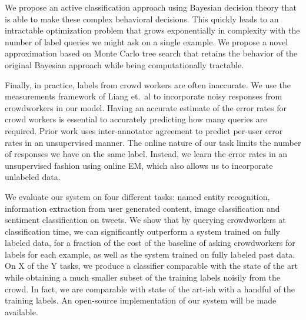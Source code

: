 We propose an active classification approach using Bayesian decision theory that is able to make these complex behavioral decisions.
This quickly leads to an intractable optimization problem that grows exponentially in complexity with the number of label queries we might ask on a single example.
We propose a novel approximation based on Monte Carlo tree search that retains the behavior of the original Bayesian approach while being computationally tractable.


Finally, in practice, labels from crowd workers are often inaccurate.
We use the measurements framework of Liang et.\ al\cite{liang09measurements} to incorporate noisy responses from crowdworkers in our model.
Having an accurate estimate of the error rates for crowd workers is essential to accurately predicting how many queries are required.
Prior work uses inter-annotator agreement to predict per-user error rates in an unsupervised manner. 
The online nature of our task limits the number of responses we have on the same label.
Instead, we learn the error rates in an unsupervised fashion using online EM, which also allows us to incorporate unlabeled data.

We evaluate our system on four different tasks: named entity recognition, information extraction from user generated content, image classification and sentiment classification on tweets.
We show that by querying crowdworkers at classification time, we can significantly outperform a system trained on fully labeled data, for a fraction of the cost of the baseline of asking crowdworkers for labels for each example, as well as the system trained on fully labeled past data.
On X of the Y tasks, we produce a classifier comparable with the state of the art while obtaining a much smaller subset of the training labels noisily from the crowd. 
In fact, we are comparable with state of the art-ish with a handful of the training labels.
An open-source implementation of our system will be made available.

